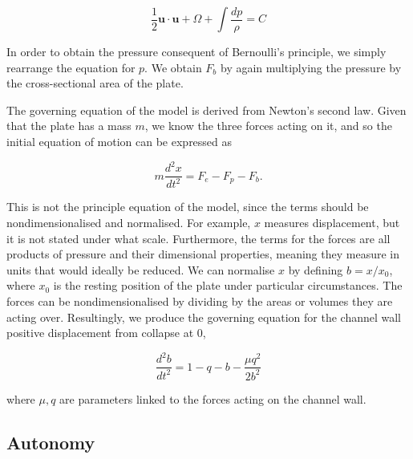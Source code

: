 \documentclass{article}
\begin{document}
\begin{equation}
    \frac{1}{2}\mathbf{u}\cdot\mathbf{u} + \Omega + \int\frac{dp}{\rho} = C
    \label{eqn:bernoulli}
\end{equation}

In order to obtain the pressure consequent of Bernoulli's principle, we simply rearrange the equation for $p$.
We obtain $F_b$ by again multiplying the pressure by the cross-sectional area of the plate.


The governing equation of the model is derived from Newton's second law.
Given that the plate has a mass $m$, we know the three forces acting on it,
and so the initial equation of motion can be expressed as

\begin{equation}
    m\frac{d^2 x}{dt^2} = F_e - F_p - F_b.
    \label{eqn:model_init}
\end{equation}

This is not the principle equation of the model,
since the terms should be nondimensionalised and normalised.
For example, $x$ measures displacement,
but it is not stated under what scale.
Furthermore, the terms for the forces are all products of pressure and their dimensional properties,
meaning they measure in units that would ideally be reduced. 
We can normalise $x$ by defining $b = x/x_0$, where $x_0$ is the resting position of the plate under particular circumstances.
The forces can be nondimensionalised by dividing by the areas or volumes they are acting over.
Resultingly, we produce the governing equation for the channel wall positive displacement from collapse at $0$,

\begin{equation}
    \frac{d^2b}{dt^2} = 1 - q - b - \frac{\mu q^2}{2b^2}
    \label{eqn:master}
\end{equation}

where $\mu, q$ are parameters linked to the forces acting on the channel wall.


\subsection{Autonomy}
\end{document}
